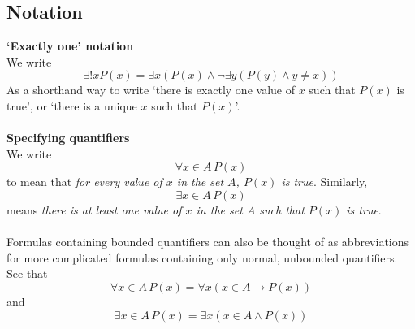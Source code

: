 \documentclass{report}
\theoremstyle{definition}
\begin{document}
\subsection{Notation}
\textbf{`Exactly one' notation}\\
We write 
\begin{equation*}
\exists!xP(x)=\exists x(P(x)\land\neg\exists y(P(y)\land y\neq x))
\end{equation*}
As a shorthand way to write `there is exactly one value of $x$ such that $P(x)$ is true', or `there is a unique $x$ such that $P(x)$'.\\
\vspace{1mm}\\
\textbf{Specifying quantifiers}\\
We write
\begin{equation*}
\forall x\in A\, P(x)
\end{equation*}
to mean that \textit{for every value of $x$ in the set $A$, $P(x)$ is true}. Similarly,
\begin{equation*}
\exists x\in A\, P(x)
\end{equation*}
means \textit{there is at least one value of $x $ in the set $A$ such that $P(x)$ is true}.\\
\vspace{1mm}\\
Formulas containing bounded quantifiers can also be thought of as abbreviations for more complicated formulas containing only normal, unbounded quantifiers. See that 
\begin{equation*}
\forall x\in A\, P(x)=\forall x(x\in A\to P(x))
\end{equation*}
and
\begin{equation*}
\exists x\in A\,P(x)=\exists x(x\in A\land P(x))
\end{equation*}
\newpage
\end{document}
